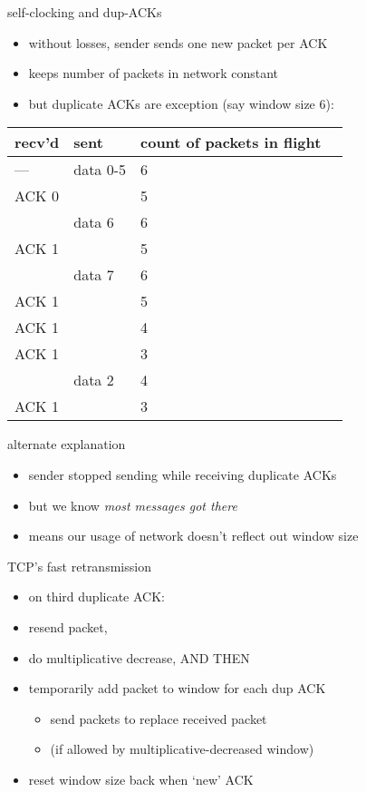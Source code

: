 \begin{frame}{self-clocking and dup-ACKs}
    \begin{itemize}
    \item without losses, sender sends one new packet per ACK
    \item keeps number of packets in network constant
    \item but duplicate ACKs are exception (say window size 6):
    \end{itemize}
{\fontsize{10}{11}\selectfont
\begin{tabular}{llll}
recv'd & sent & count of packets in flight \\ \hline
--- & data 0-5 & 6 \\
ACK 0 & ~ & 5 \\
~ & data 6 & 6 \\
ACK 1 & ~ & 5 \\
~ & data 7 & 6 \\
ACK 1 & ~  & 5 \\
ACK 1 & ~  & 4 \\
ACK 1 & ~ & 3 \\
~ & data 2 & 4 \\
ACK 1 & ~ & 3 \\
\end{tabular}
}
\end{frame}

\begin{frame}{alternate explanation}
    \begin{itemize}
    \item sender stopped sending while receiving duplicate ACKs
    \item but we know \textit{most messages got there}
    \item means our usage of network doesn't reflect out window size
    \end{itemize}
\end{frame}

\begin{frame}{TCP's fast retransmission}
\begin{itemize}
\item on third duplicate ACK:
\vspace{.5cm}
\item resend packet,
\item do multiplicative decrease, AND THEN
\item temporarily add packet to window for each dup ACK
    \begin{itemize}
    \item send packets to replace received packet
    \item (if allowed by multiplicative-decreased window)
    \end{itemize}
\item reset window size back when `new' ACK
\end{itemize}
\end{frame}

